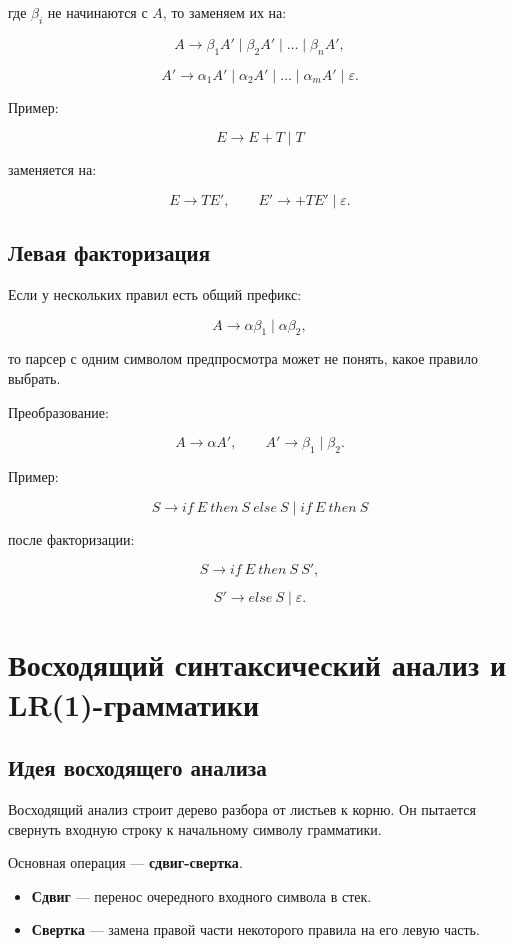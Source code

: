\documentclass[12pt,a4paper]{article}
\begin{document}
где $\beta_i$ не начинаются с $A$, то заменяем их на:

\[
A \to \beta_1 A' \mid \beta_2 A' \mid \ldots \mid \beta_n A',
\]

\[
A' \to \alpha_1 A' \mid \alpha_2 A' \mid \ldots \mid \alpha_m A' \mid \varepsilon.
\]

Пример:

\[
E \to E+T \mid T
\]

заменяется на:

\[
E \to TE',
\qquad
E' \to +TE' \mid \varepsilon.
\]

\subsection{Левая факторизация}

Если у нескольких правил есть общий префикс:

\[
A \to \alpha\beta_1 \mid \alpha\beta_2,
\]

то парсер с одним символом предпросмотра может не понять, какое правило выбрать.

Преобразование:

\[
A \to \alpha A',
\qquad
A' \to \beta_1 \mid \beta_2.
\]

Пример:

\[
S \to if\ E\ then\ S\ else\ S
\mid
if\ E\ then\ S
\]

после факторизации:

\[
S \to if\ E\ then\ S\ S',
\]

\[
S' \to else\ S \mid \varepsilon.
\]

\section{Восходящий синтаксический анализ и LR(1)-грамматики}

\subsection{Идея восходящего анализа}

Восходящий анализ строит дерево разбора от листьев к корню. Он пытается свернуть входную строку к начальному символу грамматики.

Основная операция --- \textbf{сдвиг-свертка}.

\begin{itemize}
    \item \textbf{Сдвиг} --- перенос очередного входного символа в стек.
    \item \textbf{Свертка} --- замена правой части некоторого правила на его левую часть.
\end{itemize}
\end{document}

